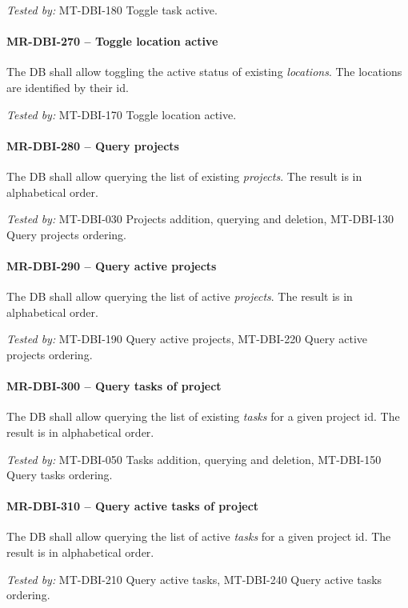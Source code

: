 \textit{Tested by: } MT-DBI-180 Toggle task active.

\paragraph{MR-DBI-270 -- Toggle location active}
The \gls{DB} shall allow toggling the active status of existing \emph{locations}.
The locations are identified by their id.

\textit{Tested by: } MT-DBI-170 Toggle location active.

\paragraph{MR-DBI-280 -- Query projects}
The \gls{DB} shall allow querying the list of existing \emph{projects}.
The result is in alphabetical order.

\textit{Tested by: } MT-DBI-030 Projects addition, querying and deletion,
MT-DBI-130 Query projects ordering.

\paragraph{MR-DBI-290 -- Query active projects}
The \gls{DB} shall allow querying the list of active \emph{projects}.
The result is in alphabetical order.

\textit{Tested by: } MT-DBI-190 Query active projects,
MT-DBI-220 Query active projects ordering.

\paragraph{MR-DBI-300 -- Query tasks of project}
The \gls{DB} shall allow querying the list of existing \emph{tasks}
for a given project id.
The result is in alphabetical order.

\textit{Tested by: } MT-DBI-050 Tasks addition, querying and deletion,
MT-DBI-150 Query tasks ordering.

\paragraph{MR-DBI-310 -- Query active tasks of project}
The \gls{DB} shall allow querying the list of active \emph{tasks}
for a given project id.
The result is in alphabetical order.

\textit{Tested by: } MT-DBI-210 Query active tasks,
MT-DBI-240 Query active tasks ordering.

